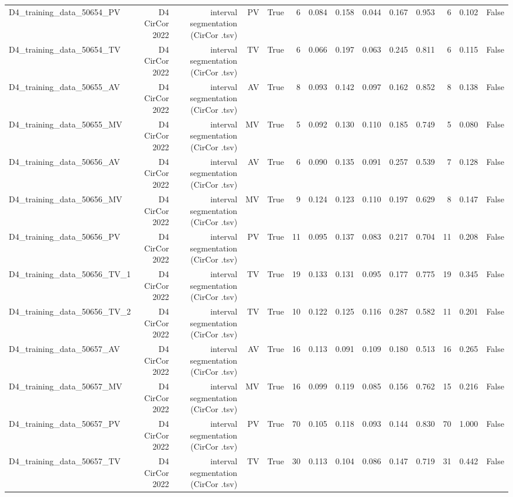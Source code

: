 \begin{table}[htbp]
\begin{tabular}{lrrrrrrrrrrrrr}
    D4\_training\_data\_50654\_PV & D4 CirCor 2022 & interval segmentation (CirCor .tsv) & PV & True & 6 & 0.084 & 0.158 & 0.044 & 0.167 & 0.953 & 6 & 0.102 & False \\
    D4\_training\_data\_50654\_TV & D4 CirCor 2022 & interval segmentation (CirCor .tsv) & TV & True & 6 & 0.066 & 0.197 & 0.063 & 0.245 & 0.811 & 6 & 0.115 & False \\
    D4\_training\_data\_50655\_AV & D4 CirCor 2022 & interval segmentation (CirCor .tsv) & AV & True & 8 & 0.093 & 0.142 & 0.097 & 0.162 & 0.852 & 8 & 0.138 & False \\
    D4\_training\_data\_50655\_MV & D4 CirCor 2022 & interval segmentation (CirCor .tsv) & MV & True & 5 & 0.092 & 0.130 & 0.110 & 0.185 & 0.749 & 5 & 0.080 & False \\
    D4\_training\_data\_50656\_AV & D4 CirCor 2022 & interval segmentation (CirCor .tsv) & AV & True & 6 & 0.090 & 0.135 & 0.091 & 0.257 & 0.539 & 7 & 0.128 & False \\
    D4\_training\_data\_50656\_MV & D4 CirCor 2022 & interval segmentation (CirCor .tsv) & MV & True & 9 & 0.124 & 0.123 & 0.110 & 0.197 & 0.629 & 8 & 0.147 & False \\
    D4\_training\_data\_50656\_PV & D4 CirCor 2022 & interval segmentation (CirCor .tsv) & PV & True & 11 & 0.095 & 0.137 & 0.083 & 0.217 & 0.704 & 11 & 0.208 & False \\
    D4\_training\_data\_50656\_TV\_1 & D4 CirCor 2022 & interval segmentation (CirCor .tsv) & TV & True & 19 & 0.133 & 0.131 & 0.095 & 0.177 & 0.775 & 19 & 0.345 & False \\
    D4\_training\_data\_50656\_TV\_2 & D4 CirCor 2022 & interval segmentation (CirCor .tsv) & TV & True & 10 & 0.122 & 0.125 & 0.116 & 0.287 & 0.582 & 11 & 0.201 & False \\
    D4\_training\_data\_50657\_AV & D4 CirCor 2022 & interval segmentation (CirCor .tsv) & AV & True & 16 & 0.113 & 0.091 & 0.109 & 0.180 & 0.513 & 16 & 0.265 & False \\
    D4\_training\_data\_50657\_MV & D4 CirCor 2022 & interval segmentation (CirCor .tsv) & MV & True & 16 & 0.099 & 0.119 & 0.085 & 0.156 & 0.762 & 15 & 0.216 & False \\
    D4\_training\_data\_50657\_PV & D4 CirCor 2022 & interval segmentation (CirCor .tsv) & PV & True & 70 & 0.105 & 0.118 & 0.093 & 0.144 & 0.830 & 70 & 1.000 & False \\
    D4\_training\_data\_50657\_TV & D4 CirCor 2022 & interval segmentation (CirCor .tsv) & TV & True & 30 & 0.113 & 0.104 & 0.086 & 0.147 & 0.719 & 31 & 0.442 & False \\

\end{tabular}
\end{table}
